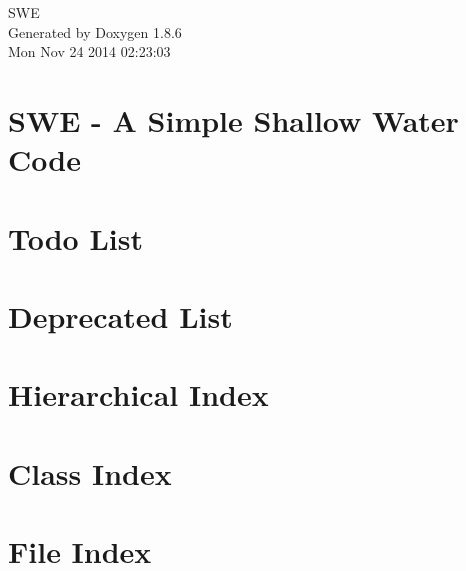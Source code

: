 \documentclass[twoside]{book}
\newcommand{\clearemptydoublepage}{%
  \newpage{\pagestyle{empty}\cleardoublepage}%
}
\begin{document}
\hypersetup{pageanchor=false}
\begin{titlepage}
\vspace*{7cm}
\begin{center}%
{\Large S\-W\-E }\\
\vspace*{1cm}
{\large Generated by Doxygen 1.8.6}\\
\vspace*{0.5cm}
{\small Mon Nov 24 2014 02:23:03}\\
\end{center}
\end{titlepage}
\clearemptydoublepage
\tableofcontents
\clearemptydoublepage
{}
\hypersetup{pageanchor=true}

\chapter{S\-W\-E -\/ A Simple Shallow Water Code}
\label{index}\hypertarget{index}{}
\chapter{Todo List}
\label{todo}
\hypertarget{todo}{}

\chapter{Deprecated List}
\label{deprecated}
\hypertarget{deprecated}{}

\chapter{Hierarchical Index}

\chapter{Class Index}

\chapter{File Index}

\end{document}
